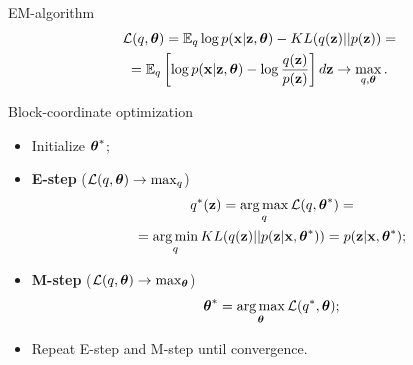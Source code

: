 \begin{frame}{EM-algorithm}
	\vspace{-0.5cm}
	\begin{multline*}
		\mathcal{L} (q, \boldsymbol{\theta})  =  \mathbb{E}_{q} \log p(\mathbf{x} | \mathbf{z}, \boldsymbol{\theta}) - KL (q(\mathbf{z}) || p(\mathbf{z})) = \\ = \mathbb{E}_q \left[ \log p(\mathbf{x} | \mathbf{z}, \boldsymbol{\theta}) - \log \frac{q(\mathbf{z})}{p(\mathbf{z})} \right]d\mathbf{z} \rightarrow \max_{q, \boldsymbol{\theta}}.
	\end{multline*}
	\vspace{-0.5cm}
	\begin{block}{Block-coordinate optimization}
		\begin{itemize}
			\item Initialize $\boldsymbol{\theta}^*$;
			\item \textbf{E-step} ($\mathcal{L} (q, \boldsymbol{\theta}) \rightarrow \max_q$)
			\vspace{-0.2cm}
			\begin{multline*}
				q^*(\mathbf{z}) = \operatorname*{arg\,max}_q \mathcal{L} (q, \boldsymbol{\theta}^*) = \\
				= \operatorname*{arg\,min}_q KL(q(\mathbf{z}) || p(\mathbf{z} | \mathbf{x}, \boldsymbol{\theta}^*)) = p(\mathbf{z}| \mathbf{x}, \boldsymbol{\theta}^*);
			\end{multline*}
			\item \textbf{M-step} ($\mathcal{L} (q, \boldsymbol{\theta}) \rightarrow \max_{\boldsymbol{\theta}}$)
			\vspace{-0.2cm}
			\[
				\boldsymbol{\theta}^* = \operatorname*{arg\,max}_{\boldsymbol{\theta}} \mathcal{L} (q^*, \boldsymbol{\theta});
			\]
			\vspace{-0.2cm}
			\item Repeat E-step and M-step until convergence.
		\end{itemize}
	\end{block}
\end{frame}
